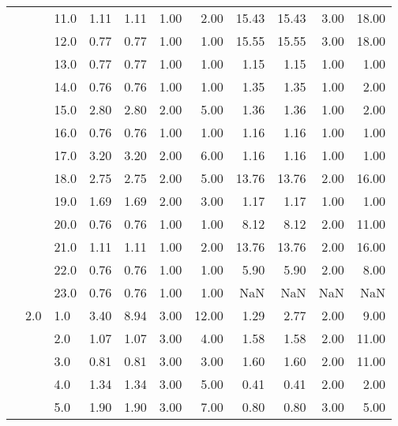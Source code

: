 \begin{tabular}{lllrrrrrrrr}
       &     & 11.0 &       1.11 &      1.11 &  1.00 &   2.00 &      15.43 &     15.43 & 3.00 &  18.00 \\
       &     & 12.0 &       0.77 &      0.77 &  1.00 &   1.00 &      15.55 &     15.55 & 3.00 &  18.00 \\
       &     & 13.0 &       0.77 &      0.77 &  1.00 &   1.00 &       1.15 &      1.15 & 1.00 &   1.00 \\
       &     & 14.0 &       0.76 &      0.76 &  1.00 &   1.00 &       1.35 &      1.35 & 1.00 &   2.00 \\
       &     & 15.0 &       2.80 &      2.80 &  2.00 &   5.00 &       1.36 &      1.36 & 1.00 &   2.00 \\
       &     & 16.0 &       0.76 &      0.76 &  1.00 &   1.00 &       1.16 &      1.16 & 1.00 &   1.00 \\
       &     & 17.0 &       3.20 &      3.20 &  2.00 &   6.00 &       1.16 &      1.16 & 1.00 &   1.00 \\
       &     & 18.0 &       2.75 &      2.75 &  2.00 &   5.00 &      13.76 &     13.76 & 2.00 &  16.00 \\
       &     & 19.0 &       1.69 &      1.69 &  2.00 &   3.00 &       1.17 &      1.17 & 1.00 &   1.00 \\
       &     & 20.0 &       0.76 &      0.76 &  1.00 &   1.00 &       8.12 &      8.12 & 2.00 &  11.00 \\
       &     & 21.0 &       1.11 &      1.11 &  1.00 &   2.00 &      13.76 &     13.76 & 2.00 &  16.00 \\
       &     & 22.0 &       0.76 &      0.76 &  1.00 &   1.00 &       5.90 &      5.90 & 2.00 &   8.00 \\
       &     & 23.0 &       0.76 &      0.76 &  1.00 &   1.00 &        NaN &       NaN &  NaN &    NaN \\
       & 2.0 & 1.0  &       3.40 &      8.94 &  3.00 &  12.00 &       1.29 &      2.77 & 2.00 &   9.00 \\
       &     & 2.0  &       1.07 &      1.07 &  3.00 &   4.00 &       1.58 &      1.58 & 2.00 &  11.00 \\
       &     & 3.0  &       0.81 &      0.81 &  3.00 &   3.00 &       1.60 &      1.60 & 2.00 &  11.00 \\
       &     & 4.0  &       1.34 &      1.34 &  3.00 &   5.00 &       0.41 &      0.41 & 2.00 &   2.00 \\
       &     & 5.0  &       1.90 &      1.90 &  3.00 &   7.00 &       0.80 &      0.80 & 3.00 &   5.00 \\

\end{tabular}
